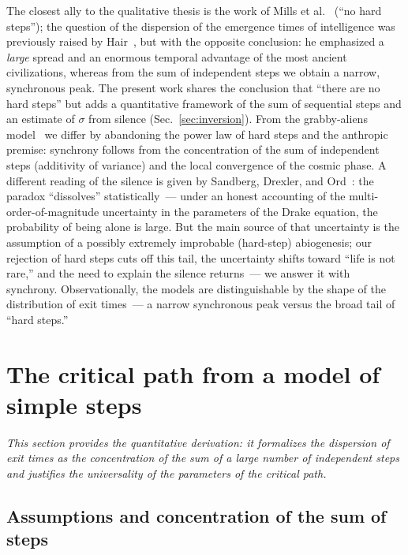 \documentclass[11pt,a4paper]{article}
\begin{document}
The closest ally to the qualitative thesis is the work of Mills et al.~\cite{Mills2025} (``no hard steps''); the question of the dispersion of the emergence times of intelligence was previously raised by Hair~\cite{Hair2011}, but with the opposite conclusion: he emphasized a \emph{large} spread and an enormous temporal advantage of the most ancient civilizations, whereas from the sum of independent steps we obtain a narrow, synchronous peak. The present work shares the conclusion that ``there are no hard steps'' but adds a quantitative framework of the sum of sequential steps and an estimate of $\sigma$ from silence (Sec.~\ref{sec:inversion}). From the grabby-aliens model~\cite{Hanson2021} we differ by abandoning the power law of hard steps and the anthropic premise: synchrony follows from the concentration of the sum of independent steps (additivity of variance) and the local convergence of the cosmic phase. A different reading of the silence is given by Sandberg, Drexler, and Ord~\cite{Sandberg2018}: the paradox ``dissolves'' statistically~--- under an honest accounting of the multi-order-of-magnitude uncertainty in the parameters of the Drake equation, the probability of being alone is large. But the main source of that uncertainty is the assumption of a possibly extremely improbable (hard-step) abiogenesis; our rejection of hard steps cuts off this tail, the uncertainty shifts toward ``life is not rare,'' and the need to explain the silence returns~--- we answer it with synchrony. Observationally, the models are distinguishable by the shape of the distribution of exit times~--- a narrow synchronous peak versus the broad tail of ``hard steps.''

\section{The critical path from a model of simple steps}
\label{sec:steps}

\textit{This section provides the quantitative derivation: it formalizes the dispersion of exit times as the concentration of the sum of a large number of independent steps and justifies the universality of the parameters of the critical path.}

\subsection{Assumptions and concentration of the sum of steps}
\label{sec:concentration}
\end{document}
